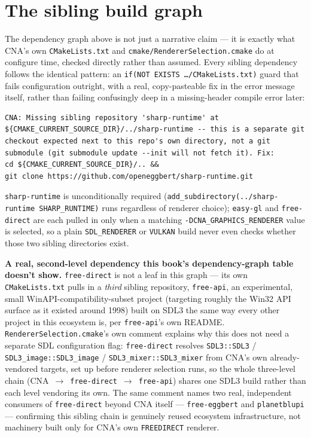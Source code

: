 \section{The sibling build graph}
\label{sec:sibling-wiring}

The dependency graph above is not just a narrative claim --- it is exactly what CNA's own
\texttt{CMakeLists.txt} and \texttt{cmake/RendererSelection.cmake} do at configure time, checked
directly rather than assumed. Every sibling dependency follows the identical pattern: an
\texttt{if(NOT EXISTS \ldots/CMakeLists.txt)} guard that fails configuration outright, with a
real, copy-pasteable fix in the error message itself, rather than failing confusingly deep in a
missing-header compile error later:

\begin{lstlisting}[style=cnashell]
CNA: Missing sibling repository 'sharp-runtime' at
${CMAKE_CURRENT_SOURCE_DIR}/../sharp-runtime -- this is a separate git
checkout expected next to this repo's own directory, not a git
submodule (git submodule update --init will not fetch it). Fix:
cd ${CMAKE_CURRENT_SOURCE_DIR}/.. &&
git clone https://github.com/openeggbert/sharp-runtime.git
\end{lstlisting}

\texttt{sharp-runtime} is unconditionally required (\texttt{add\_subdirectory(../sharp-runtime
SHARP\_RUNTIME)} runs regardless of renderer choice); \texttt{easy-gl} and \texttt{free-direct}
are each pulled in only when a matching \texttt{-DCNA\_GRAPHICS\_RENDERER} value is selected,
so a plain \texttt{SDL\_RENDERER} or \texttt{VULKAN} build never even checks whether those two
sibling directories exist.

\begin{sourcenote}
\textbf{A real, second-level dependency this book's dependency-graph table doesn't show.}
\texttt{free-direct} is not a leaf in this graph --- its own \texttt{CMakeLists.txt} pulls in a
\emph{third} sibling repository, \texttt{free-api}, an experimental, small
WinAPI-compatibility-subset project (targeting roughly the Win32 API surface as it existed
around 1998) built on SDL3 the same way every other project in this ecosystem is, per
\texttt{free-api}'s own README. \texttt{RendererSelection.cmake}'s own comment explains why this
does not need a separate SDL configuration flag: \texttt{free-direct} resolves
\texttt{SDL3::SDL3} / \texttt{SDL3\_image::SDL3\_image} / \texttt{SDL3\_mixer::SDL3\_mixer} from
CNA's own already-vendored targets, set up before renderer selection runs, so the whole
three-level chain (CNA~$\to$~\texttt{free-direct}~$\to$~\texttt{free-api}) shares one SDL3
build rather than each level vendoring its own. The same comment names two real, independent
consumers of \texttt{free-direct} beyond CNA itself --- \texttt{free-eggbert} and
\texttt{planetblupi} --- confirming this sibling chain is genuinely reused ecosystem
infrastructure, not machinery built only for CNA's own \texttt{FREEDIRECT} renderer.
\end{sourcenote}

